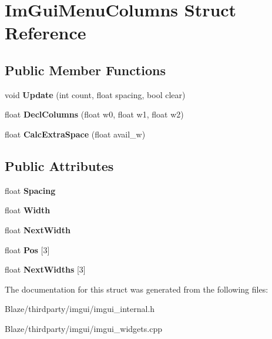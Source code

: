 \hypertarget{structImGuiMenuColumns}{}\section{Im\+Gui\+Menu\+Columns Struct Reference}
\label{structImGuiMenuColumns}
\subsection*{Public Member Functions}
\begin{DoxyCompactItemize}
\item 
\mbox{\label{structImGuiMenuColumns_a1104dfb001d48ab8c89bb1858da0eaf8}} 
void {\bfseries Update} (int count, float spacing, bool clear)
\item 
\mbox{\label{structImGuiMenuColumns_ad8d50936ca3240d75c285d7e373bc892}} 
float {\bfseries Decl\+Columns} (float w0, float w1, float w2)
\item 
\mbox{\label{structImGuiMenuColumns_a56aa33999066e80cab3ca37ac2e9ba37}} 
float {\bfseries Calc\+Extra\+Space} (float avail\+\_\+w)
\end{DoxyCompactItemize}
\subsection*{Public Attributes}
\begin{DoxyCompactItemize}
\item 
\mbox{\label{structImGuiMenuColumns_afed09334fed58658bc891f4c65106cb4}} 
float {\bfseries Spacing}
\item 
\mbox{\label{structImGuiMenuColumns_a3cca7e65a4625a41a4b9c59c1aaea15d}} 
float {\bfseries Width}
\item 
\mbox{\label{structImGuiMenuColumns_a0882d287ca8718a3b5b92d0d00df839d}} 
float {\bfseries Next\+Width}
\item 
\mbox{\label{structImGuiMenuColumns_aea3aa6152178065159b959dbcc84eede}} 
float {\bfseries Pos} \mbox{[}3\mbox{]}
\item 
\mbox{\label{structImGuiMenuColumns_a618463881adaac2df257939b9a69efc4}} 
float {\bfseries Next\+Widths} \mbox{[}3\mbox{]}
\end{DoxyCompactItemize}


The documentation for this struct was generated from the following files\+:\begin{DoxyCompactItemize}
\item 
Blaze/thirdparty/imgui/imgui\+\_\+internal.\+h\item 
Blaze/thirdparty/imgui/imgui\+\_\+widgets.\+cpp\end{DoxyCompactItemize}
